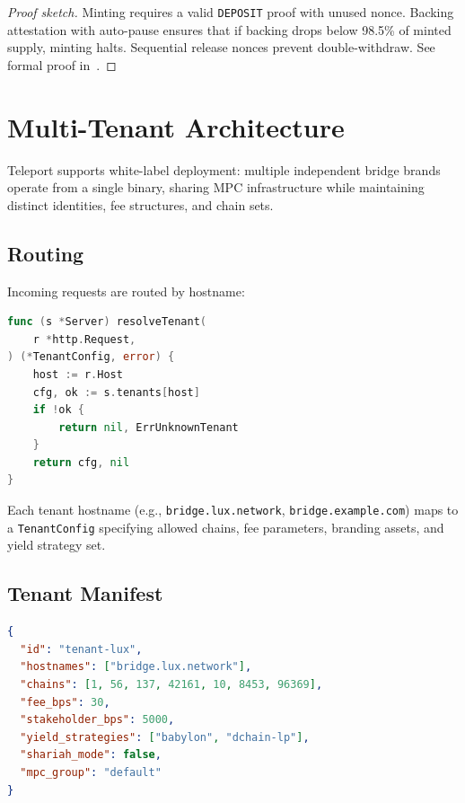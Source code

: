 \documentclass[11pt]{article}
\begin{document}
\begin{proof}[Proof sketch]
Minting requires a valid \texttt{DEPOSIT} proof with unused nonce. Backing attestation with auto-pause ensures that if backing drops below 98.5\% of minted supply, minting halts. Sequential release nonces prevent double-withdraw. See formal proof in~\cite{luxproof-teleport}.
\end{proof}

\section{Multi-Tenant Architecture}
\label{sec:multitenant}

Teleport supports white-label deployment: multiple independent bridge brands operate from a single binary, sharing MPC infrastructure while maintaining distinct identities, fee structures, and chain sets.

\subsection{Routing}

Incoming requests are routed by hostname:

\begin{lstlisting}[language=Go,caption={Hostname-based tenant routing}]
func (s *Server) resolveTenant(
    r *http.Request,
) (*TenantConfig, error) {
    host := r.Host
    cfg, ok := s.tenants[host]
    if !ok {
        return nil, ErrUnknownTenant
    }
    return cfg, nil
}
\end{lstlisting}

Each tenant hostname (e.g., \texttt{bridge.lux.network}, \texttt{bridge.example.com}) maps to a \texttt{TenantConfig} specifying allowed chains, fee parameters, branding assets, and yield strategy set.

\subsection{Tenant Manifest}

\begin{lstlisting}[language=JSON,caption={Tenant manifest example}]
{
  "id": "tenant-lux",
  "hostnames": ["bridge.lux.network"],
  "chains": [1, 56, 137, 42161, 10, 8453, 96369],
  "fee_bps": 30,
  "stakeholder_bps": 5000,
  "yield_strategies": ["babylon", "dchain-lp"],
  "shariah_mode": false,
  "mpc_group": "default"
}
\end{lstlisting}
\end{document}
